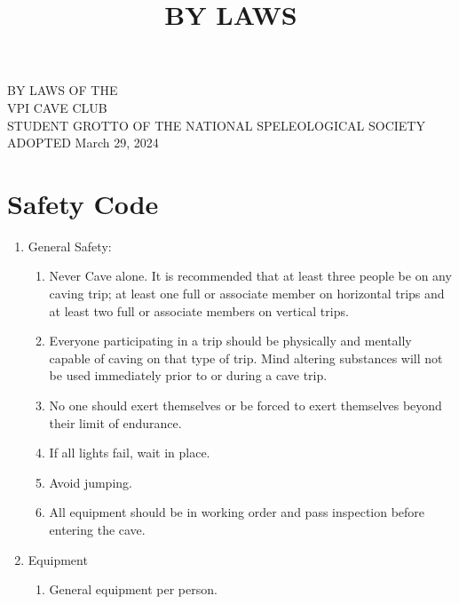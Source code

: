 \documentclass[
]{article}
\title{BY LAWS}
\author{}
\date{}
\providecommand{\tightlist}{%
  \setlength{\itemsep}{0pt}\setlength{\parskip}{0pt}}
\begin{document}
\maketitle

{
\setcounter{tocdepth}{3}
\tableofcontents
}
\newpage{}

BY LAWS OF THE\\
VPI CAVE CLUB\\
STUDENT GROTTO OF THE NATIONAL SPELEOLOGICAL SOCIETY\\
ADOPTED March 29, 2024

\hypertarget{safety-code}{%
\section{Safety Code}\label{safety-code}}

\begin{enumerate}
\def\labelenumi{\arabic{enumi}.}
\tightlist
\item
  General Safety:

  \begin{enumerate}
  \def\labelenumii{\Alph{enumii}.}
  \tightlist
  \item
    Never Cave alone. It is recommended that at least three people be on
    any caving trip; at least one full or associate member on horizontal
    trips and at least two full or associate members on vertical trips.
  \item
    Everyone participating in a trip should be physically and mentally
    capable of caving on that type of trip. Mind altering substances
    will not be used immediately prior to or during a cave trip.
  \item
    No one should exert themselves or be forced to exert themselves
    beyond their limit of endurance.
  \item
    If all lights fail, wait in place.
  \item
    Avoid jumping.
  \item
    All equipment should be in working order and pass inspection before
    entering the cave.
  \end{enumerate}
\item
  Equipment

  \begin{enumerate}
  \def\labelenumii{\Alph{enumii}.}
  \tightlist
  \item
    General equipment per person.


\end{enumerate}
\end{enumerate}
\end{document}
